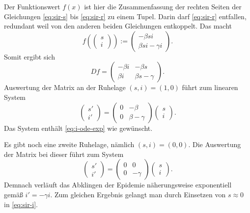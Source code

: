 \documentclass[a4paper,10pt,fleqn,twocolumn,twoside,dvipdfmx]{scrartcl}
\numberwithin{equation}{section}
\begin{document}
Der Funktionswert $f(x)$ ist hier die Zusammenfassung der rechten
Seiten der Gleichungen \eqref{eq:sir-s} bis \eqref{eq:sir-r} zu einem
Tupel. Darin darf \eqref{eq:sir-r} entfallen, redundant weil von
den anderen beiden Gleichungen entkoppelt. Das macht%
\begin{equation}
f(\begin{pmatrix}s\\ i\end{pmatrix})
:= \begin{pmatrix}-\beta s i\\ \beta si - \gamma i\end{pmatrix}.
\end{equation}
Somit ergibt sich
\begin{equation}
Df = \begin{pmatrix}
-\beta i & -\beta s\\
\beta i & \beta s - \gamma
\end{pmatrix}.
\end{equation}
Auswertung der Matrix an der Ruhelage $(s,i)=(1,0)$ führt zum linearen
System%
\begin{equation}
\begin{pmatrix}
s'\\ i'
\end{pmatrix}
= \begin{pmatrix}
0 & -\beta\\
0 & \beta-\gamma
\end{pmatrix}
\begin{pmatrix}
s\\ i
\end{pmatrix}.
\end{equation}
Das System enthält \eqref{eq:i-ode-exp} wie gewünscht.

Es gibt noch eine zweite Ruhelage, nämlich $(s,i)=(0,0)$. Die
Auswertung der Matrix bei dieser führt zum System
\begin{equation}
\begin{pmatrix}
s'\\ i'
\end{pmatrix}
= \begin{pmatrix}
0 & 0\\
0 & -\gamma
\end{pmatrix}
\begin{pmatrix}
s\\ i
\end{pmatrix}.
\end{equation}
Demnach verläuft das Abklingen der Epidemie näherungsweise exponentiell
gemäß $i' = -\gamma i$. Zum gleichen Ergebnis gelangt man durch
Einsetzen von $s\approx 0$ in \eqref{eq:sir-i}.
\end{document}

